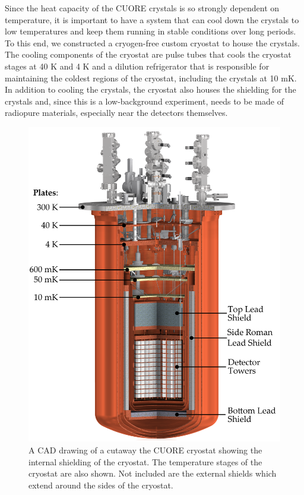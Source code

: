Since the heat capacity of the CUORE crystals is so strongly dependent on temperature, it is important to have a system that can cool down the crystals to low temperatures and keep them running in stable conditions over long periods.
To this end, we constructed a cryogen-free custom cryostat to house the crystals.
The cooling components of the cryostat are pulse tubes that cools the cryostat stages at 40 K and 4 K and a dilution refrigerator that is responsible for maintaining the coldest regions of the cryostat, including the crystals at 10 mK.
In addition to cooling the crystals, the cryostat also houses the shielding for the crystals and, since this is a low-background experiment, needs to be made of radiopure materials, especially near the detectors themselves.

\begin{figure}[htbp]
\centering
\includegraphics[width=\linewidth]{Figures/cryostat_Adjusted.png}
\caption[CAD cutaway of the CUORE cryostat.]
{A CAD drawing of a cutaway the CUORE cryostat showing the internal shielding of the cryostat.
The temperature stages of the cryostat are also shown.
Not included are the external shields which extend around the sides of the cryostat.}
\label{fig:cryostat_cad_cutout}
\end{figure}

